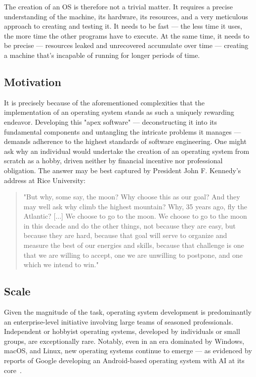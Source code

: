 \documentclass[a4paper,10pt,twoside]{report}
\theoremstyle{definition}
\begin{document}
The creation of an OS is therefore not a trivial matter. It requires a precise understanding of the machine, its hardware, its resources, and a very meticulous approach to creating and testing it. It needs to be fast --- the less time it uses, the more time the other programs have to execute. At the same time, it needs to be precise --- resources leaked and unrecovered accumulate over time --- creating a machine that's incapable of running for longer periods of time. 

\subsection{Motivation}

It is precisely because of the aforementioned complexities that the implementation of an operating system stands as such a uniquely rewarding endeavor. Developing this "apex software" --- deconstructing it into its fundamental components and untangling the intricate problems it manages --- demands adherence to the highest standards of software engineering. One might ask why an individual would undertake the creation of an operating system from scratch as a hobby, driven neither by financial incentive nor professional obligation. The answer may be best captured by President John F. Kennedy's address at Rice University:

\begin{quote}
"But why, some say, the moon? Why choose this as our goal? And they may well ask why climb the highest mountain? Why, 35 years ago, fly the Atlantic? [...] We choose to go to the moon. We choose to go to the moon in this decade and do the other things, not because they are easy, but because they are hard, because that goal will serve to organize and measure the best of our energies and skills, because that challenge is one that we are willing to accept, one we are unwilling to postpone, and one which we intend to win."
\end{quote}

\subsection{Scale}

Given the magnitude of the task, operating system development is predominantly an enterprise-level initiative involving large teams of seasoned professionals. Independent or hobbyist operating systems, developed by individuals or small groups, are exceptionally rare. Notably, even in an era dominated by Windows, macOS, and Linux, new operating systems continue to emerge --- as evidenced by reports of Google developing an Android-based operating system with AI at its core~\cite{google_aluminium_os}.
\end{document}

